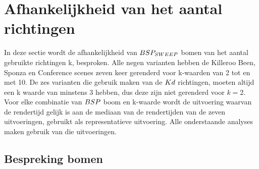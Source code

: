 \section{Afhankelijkheid van het aantal richtingen}
\label{h5-richtingen}
In deze sectie wordt de afhankelijkheid van $BSP_{SWEEP}$ bomen van het aantal gebruikte richtingen k, besproken. 
Alle negen varianten hebben de Killeroo Been, Sponza en Conference scenes zeven keer gerenderd voor k-waarden van 2 tot en met 10.
De zes varianten die gebruik maken van de $Kd$ richtingen, moeten altijd een k waarde van minstens 3 hebben, dus deze zijn niet gerenderd voor $k = 2$.
Voor elke combinatie van $BSP$ boom en k-waarde wordt de uitvoering waarvan de rendertijd gelijk is aan de mediaan van de rendertijden van de zeven uitvoeringen, gebruikt als representatieve uitvoering.
Alle onderstaande analyses maken gebruik van die uitvoeringen.
\subsection{Bespreking bomen}
\label{h5-richtingen-bespreking}
